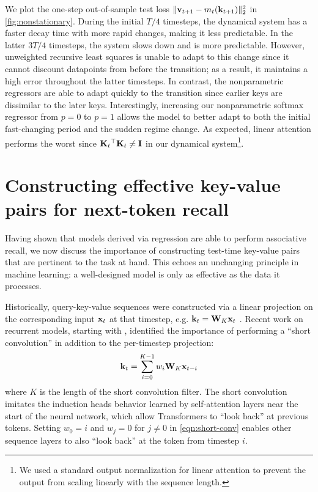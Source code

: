 \documentclass[notitlepage, 11pt]{article}
\newcommand*{\memory}{{m}}
\begin{document}
We plot the one-step out-of-sample test loss $\norm{\vbf_{t+1} - \memory_t(\kbf_{t+1})}_2^2$ in \autoref{fig:nonstationary}.
During the initial $T/4$ timesteps, the dynamical system has a faster decay time with more rapid changes, making it less predictable.
In the latter $3T/4$ timesteps, the system slows down and is more predictable.
However, unweighted recursive least squares is unable to adapt to this change since it cannot discount datapoints from before the transition; as a result, it maintains a high error throughout the latter timesteps.
In contrast, the nonparametric regressors are able to adapt quickly to the transition since earlier keys are dissimilar to the later keys.
Interestingly, increasing our nonparametric softmax regressor from $p=0$ to $p=1$ allows the model to better adapt to both the initial fast-changing period and the sudden regime change.
As expected, linear attention performs the worst since $\mathbf{K}_t{}^\top\mathbf{K}_t \neq \mathbf{I}$ in our dynamical system\footnote{We used a standard output normalization for linear attention \citep{Qin2022DevilLinearTransformer} to prevent the output from scaling linearly with the sequence length.}.


\section{Constructing effective key-value pairs for next-token recall}\label{sec:key-construction}
Having shown that models derived via regression are able to perform associative recall, we now discuss the importance of constructing test-time key-value pairs that are pertinent to the task at hand.
This echoes an unchanging principle in machine learning: a well-designed model is only as effective as the data it processes.


Historically, query-key-value sequences were constructed via a linear projection on the corresponding input $\mathbf{x}_t$ at that timestep, e.g.  $\mathbf{k}_t = \mathbf{W}_K\mathbf{x}_t$ \citep{Vaswani2017AttentionAllYou}.
Recent work on recurrent models, starting with \citet{Fu2022HungryHungryHippos}, identified the importance of performing a ``short convolution'' in addition to the per-timestep projection:
\begin{align}
    \mathbf{k}_t = \sum_{i=0}^{K-1} w_i \mathbf{W}_K \mathbf{x}_{t-i} \label{eqn:short-conv}
\end{align}
where $K$ is the length of the short convolution filter.
The short convolution imitates the induction heads behavior learned by self-attention layers near the start of the neural network,  which allow Transformers to ``look back'' at previous tokens.
Setting $w_0=i$ and $w_j=0$ for $j\neq 0$ in \autoref{eqn:short-conv} enables other sequence layers to also ``look back'' at the token from timestep $i$.
\end{document}
